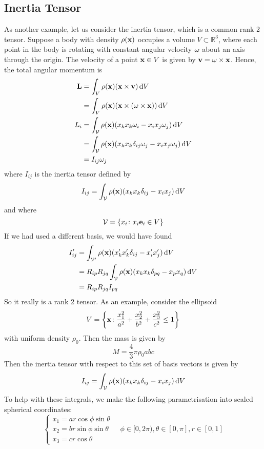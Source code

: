 \documentclass{article}
\begin{document}
\subsection{Inertia Tensor}
As another example, let us consider the inertia tensor, which is a common rank 2 tensor. Suppose a body with density $\rho(\vb x)$ occupies a volume $V \subset \mathbb R^3$, where each point in the body is rotating with constant angular velocity $\vb\omega$ about an axis through the origin. The velocity of a point $\vb x \in V$ is given by $\vb v = \vb \omega \times \vb x$. Hence, the total angular momentum is
\begin{align*}
	\vb L &= \int_V \rho(\vb x) (\vb x \times \vb v) \dd{V} \\
	&= \int_V \rho(\vb x) (\vb x \times (\vb \omega \times \vb x)) \dd{V} \\
	L_i &= \int_{\mathcal V} \rho(\vb x) (x_k x_k \omega_i - x_i x_j \omega_j) \dd{V} \\
	&= \int_{\mathcal V} \rho(\vb x) (x_k x_k \delta_{ij} \omega_j - x_i x_j \omega_j) \dd{V} \\
	&= I_{ij}\omega_j
\end{align*}
where $I_{ij}$ is the inertia tensor defined by
\[ I_{ij} = \int_{\mathcal V} \rho(\vb x) (x_k x_k \delta_{ij} - x_i x_j) \dd{V} \]
and where
\[ \mathcal V = \qty{ x_i \colon x_i \vb e_i \in V } \]
If we had used a different basis, we would have found
\begin{align*}
	I_{ij}' &= \int_{\mathcal V'} \rho(\vb x) (x_k' x_k' \delta_{ij} - x_i' x_j') \dd{V} \\
	&= R_{ip} R_{jq} \int_{\mathcal V} \rho(\vb x) (x_k x_k \delta_{pq} - x_p x_q) \dd{V} \\
	&= R_{ip} R_{jq} I_{pq}
\end{align*}
So it really is a rank 2 tensor. As an example, consider the ellipsoid
\[ V = \qty{ \vb x \colon \frac{x_1^2}{a^2} + \frac{x_2^2}{b^2} + \frac{x_3^2}{c^2} \leq 1 } \]
with uniform density $\rho_0$. Then the mass is given by
\[ M = \frac{4}{3}\pi \rho_0 abc \]
Then the inertia tensor with respect to this set of basis vectors is given by
\[ I_{ij} = \int_{\mathcal V} \rho(\vb x) (x_k x_k \delta_{ij} - x_i x_j) \dd{V} \]
To help with these integrals, we make the following parametrisation into scaled spherical coordinates:
\[ \left\{ \begin{array}{l}
	x_1 = ar\cos\phi\sin\theta \\
	x_2 = br\sin\phi\sin\theta \\
	x_3 = cr\cos\theta
\end{array} \right.\quad \phi \in [0, 2\pi), \theta \in [0, \pi], r \in [0, 1] \]
\end{document}
